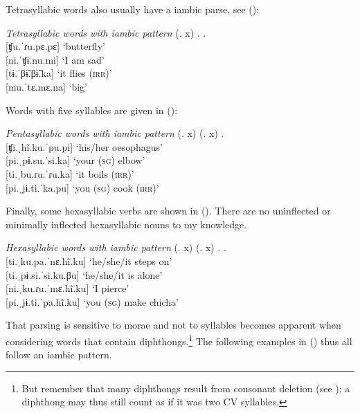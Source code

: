 Tetrasyllabic words also usually have a iambic parse, see ():

\ea\label{ex:Tetra}
 \textit{Tetrasyllabic words with iambic pattern} (. x) . .\\
    {[}ʧu.ˈɾu.pɛ.pɛ] \tab ‘butterfly’\\
    {[}ni.ˈʧɨ.nu.mi]  \tab ‘I am sad’\\
    {[}tɨ.ˈβɨ̃.βɨ̃.ka] \tab\tab ‘it flies (\textsc{irr})’\\
    {[}mu.ˈtɛ.mɛ.na] \tab ‘big’\\%
    \xe


Words with five syllables are given in ():

\ea\label{ex:Penta}
 \textit{Pentasyllabic words with iambic pattern} (. x) (. x) .\\
   {[}ʧi.ˌhĩ.ku.ˈpu.pi] \tab ‘his/her oesophagus’\\
   {[}pi.ˌpɨ.su.ˈsi.ka] \tab ‘your (\textsc{sg}) elbow’\\
   {[}ti.ˌbu.ɾu.ˈɾu.ka]  \tab ‘it boils (\textsc{irr})’\\
   {[}pi.ˌjɨ.ti.ˈka.pu]  \tab ‘you (\textsc{sg}) cook (\textsc{irr})’\\%
\xe

Finally, some hexasyllabic verbs are shown in (). There are no uninflected or minimally inflected hexasyllabic nouns to my knowledge.

\ea\label{ex:Hexa}
 \textit{Hexasyllabic words with iambic pattern} (. x) (. x) . .\\
   {[}ti.ˌku.pa.ˈnɛ.hĩ.ku] \tab\tab  ‘he/she/it steps on’\\
   {[}ti.ˌpɨ.si.ˈsi.ku.βu] \tab\tab   ‘he/she/it is alone’\\
   {[}ni.ˌku.ɾu.ˈmɛ.hĩ.ku] \tab  ‘I pierce’\\
   {[}pi.ˌjɨ.ti.ˈpa.hĩ.ku] \tab\tab  ‘you (\textsc{sg}) make chicha’\\
   \xe
   
That parsing is sensitive to morae and not to syllables becomes apparent when considering words that contain diphthongs.\footnote{But remember that many diphthongs result from consonant deletion (see ); a diphthong may thus still count as if it was two CV syllables.} 
The following examples in () thus all follow an iambic pattern.


